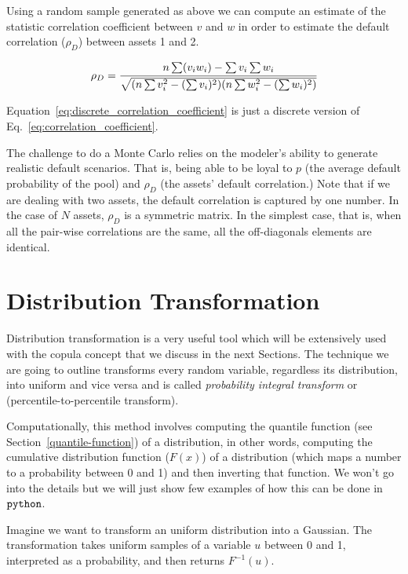 Using a random sample generated as above we can compute an estimate of
the statistic correlation coefficient between $v$ and $w$ in order to estimate
the default correlation ($\rho_D$) between assets 1 and 2.

\begin{equation}
\rho_D = \cfrac{n\sum (v_i w_i) - \sum v_i \sum w_i}{\sqrt{(n\sum v_i^2 - (\sum v_i)^2)(n\sum w_i^2 - (\sum w_i)^2)}}
\label{eq:discrete_correlation_coefficient}
\end{equation}

Equation~\ref{eq:discrete_correlation_coefficient} is just a discrete
version of Eq.~\ref{eq:correlation_coefficient}.

The challenge to do a Monte Carlo relies on the modeler’s ability to generate
realistic default scenarios. That is, being able to be loyal to $p$ (the average
default probability of the pool) and $\rho_D$ (the assets’ default correlation.) Note that if we are dealing with two assets, the default correlation is captured by one number. In the case of $N$ assets, $\rho_D$ is a symmetric matrix. In the
simplest case, that is, when all the pair-wise correlations are the same, all the
off-diagonals elements are identical. 

\section{Distribution Transformation}\label{distribution-transformation}

Distribution transformation is a very useful tool which will be
extensively used with the copula concept that we discuss in the next
Sections. The technique we are going to outline transforms every random
variable, regardless its distribution, into uniform and vice versa and is called
\emph{probability integral transform} or (percentile-to-percentile
transform).

Computationally, this method involves computing the quantile function (see Section~\ref{quantile-function}) of
a distribution, in other words, computing the cumulative
distribution function ($F(x)$) of a distribution (which maps a number
to a probability between 0 and 1) and then inverting that
function. We won't go into the details but we will just show few
examples of how this can be done in \(\tt{python}\).

Imagine we want to transform an uniform distribution into a Gaussian.
The transformation takes uniform samples of a variable \(u\) between 0 and
1, interpreted as a probability, and then returns $F^{-1}(u)$. 

